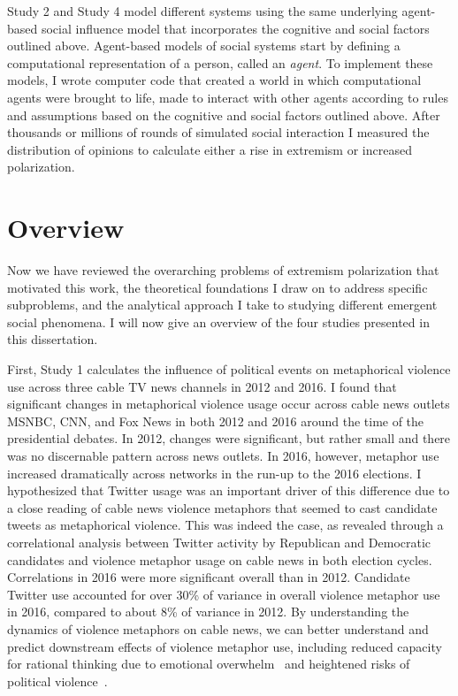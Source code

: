 Study 2 and Study 4 model different systems using the same underlying
agent-based social influence model that incorporates the cognitive and social 
factors outlined above. Agent-based models of social systems start 
by defining a computational representation of a person, called
an \emph{agent}. To implement these models, 
I wrote computer code that created a world in which computational agents
were brought to life, made to interact with other agents according to rules and
assumptions based on the cognitive and social factors outlined above. 
After thousands or millions of rounds of simulated social interaction I
measured the distribution of opinions to calculate either a rise in extremism or
increased polarization.
     

\section{Overview}

Now we have reviewed the overarching problems of extremism polarization that
motivated this work, the
theoretical foundations I draw on to address specific subproblems, and
the analytical approach I take to studying different emergent social
phenomena. I will now give an overview of the four studies presented in this
dissertation.

First, Study 1  
calculates the influence of political events on metaphorical violence use across
three cable TV news channels in 2012 and 2016. I found that significant changes
in metaphorical violence usage occur across cable news outlets MSNBC, CNN, and
Fox News in both 2012 and 2016 around the time of the presidential debates. 
In 2012, changes were significant, but rather small and there was no discernable
pattern across news outlets. In 2016, however, metaphor use increased dramatically
across networks in the run-up to the 2016 elections.  
I hypothesized that Twitter usage was an important driver of this difference due to 
a close reading of cable news violence metaphors that seemed to cast candidate
tweets as metaphorical violence. This was indeed the case, as revealed through a
correlational analysis between Twitter activity by Republican
and Democratic candidates and violence metaphor usage on cable news in both
election cycles. Correlations
in 2016 were more significant overall than in 2012. Candidate Twitter use
accounted for over 30\% of variance in overall violence metaphor use in 2016, compared to
about 8\% of variance in 2012. By understanding the
dynamics of violence metaphors on cable news, we can better understand and 
predict downstream effects of violence metaphor use, including reduced capacity
for rational thinking due to emotional overwhelm~\cite{Suhay2018} and heightened
risks of political violence~\cite{Kalmoe2014,Kalmoe2018}.

